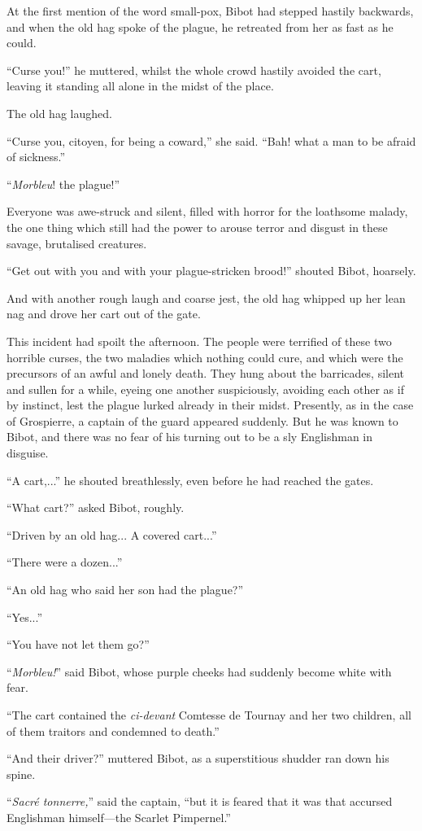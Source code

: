 At the first mention of the word small-pox, Bibot had stepped hastily backwards, and when the old hag spoke of the plague, he retreated from her as fast as he could.

\enquote{Curse you!} he muttered, whilst the whole crowd hastily avoided the cart, leaving it standing all alone in the midst of the place.

The old hag laughed.

\enquote{Curse you, citoyen, for being a coward,} she said. \enquote{Bah! what a man to be afraid of sickness.}

\enquote{\textit{Morbleu}! the plague!}

Everyone was awe-struck and silent, filled with horror for the loathsome malady, the one thing which still had the power to arouse terror and disgust in these savage, brutalised creatures.

\enquote{Get out with you and with your plague-stricken brood!} shouted Bibot, hoarsely.

And with another rough laugh and coarse jest, the old hag whipped up her lean nag and drove her cart out of the gate.

This incident had spoilt the afternoon. The people were terrified of these two horrible curses, the two maladies which nothing could cure, and which were the precursors of an awful and lonely death. They hung about the barricades, silent and sullen for a while, eyeing one another suspiciously, avoiding each other as if by instinct, lest the plague lurked already in their midst. Presently, as in the case of Grospierre, a captain of the guard appeared suddenly. But he was known to Bibot, and there was no fear of his turning out to be a sly Englishman in disguise.

\enquote{A cart,...} he shouted breathlessly, even before he had reached the gates.

\enquote{What cart?} asked Bibot, roughly.

\enquote{Driven by an old hag... A covered cart...}

\enquote{There were a dozen...}

\enquote{An old hag who said her son had the plague?}

\enquote{Yes...}

\enquote{You have not let them go?}

\enquote{\textit{Morbleu!}} said Bibot, whose purple cheeks had suddenly become white with fear.

\enquote{The cart contained the \textit{ci-devant} Comtesse de Tournay and her two children, all of them traitors and condemned to death.}

\enquote{And their driver?} muttered Bibot, as a superstitious shudder ran down his spine.

\enquote{\textit{Sacré tonnerre,}} said the captain, \enquote{but it is feared that it was that accursed Englishman himself---the Scarlet Pimpernel.}
